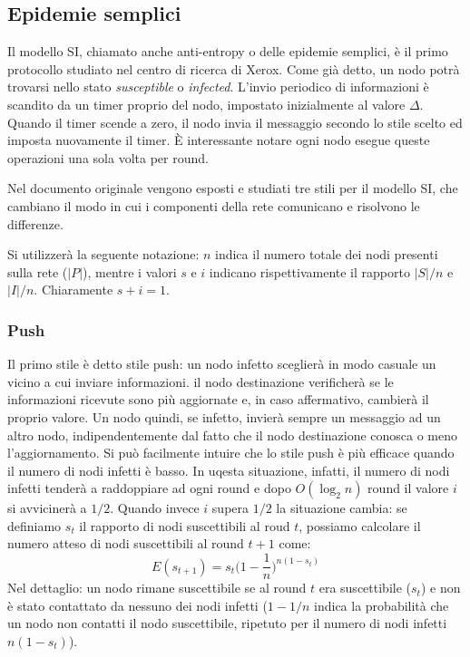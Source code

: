 \subsection{Epidemie semplici}
Il modello SI, chiamato anche anti-entropy o delle epidemie semplici, è il primo protocollo studiato nel centro di ricerca di Xerox. Come già detto, un nodo potrà trovarsi nello stato \textit{susceptible} o \textit{infected}. L'invio periodico di informazioni è scandito da un timer proprio del nodo, impostato inizialmente al valore $\Delta$. Quando il timer scende a zero, il nodo invia il messaggio secondo lo stile scelto ed imposta nuovamente il timer. È interessante notare ogni nodo esegue queste operazioni una sola volta per round.

Nel documento originale vengono esposti e studiati tre stili per il modello SI, che cambiano il modo in cui i componenti della rete comunicano e risolvono le differenze. 

Si utilizzerà la seguente notazione: $n$ indica il numero totale dei nodi presenti sulla rete ($|P|$), mentre i valori $s$ e $i$ indicano rispettivamente il rapporto $|S|/n$ e $|I|/n$. Chiaramente $s + i = 1$.
\subsubsection{Push}
Il primo stile è detto stile push: un nodo infetto sceglierà in modo casuale un vicino a cui inviare informazioni. il nodo destinazione verificherà se le informazioni ricevute sono più aggiornate e, in caso affermativo, cambierà il proprio valore. Un nodo quindi, se infetto, invierà sempre un messaggio ad un altro nodo, indipendentemente dal fatto che il nodo destinazione conosca o meno l'aggiornamento. Si può facilmente intuire che lo stile push è più efficace quando il numero di nodi infetti è basso. In uqesta situazione, infatti, il numero di nodi infetti tenderà a raddoppiare ad ogni round e dopo $O(\log_2 n)$ round il valore $i$ si avvicinerà a $1/2$. Quando invece $i$ supera $1/2$ la situazione cambia: se definiamo $s_t$ il rapporto di nodi suscettibili al roud $t$, possiamo calcolare il numero atteso di nodi suscettibili al round $t + 1$ come:
\begin{equation}
    E(s_{t + 1}) = s_t  \Big(1 - \frac{1}{n}\Big)^{n(1-s_t)}
\end{equation}
Nel dettaglio: un nodo rimane suscettibile se al round $t$ era suscettibile ($s_t$) e non è stato contattato da nessuno dei nodi infetti ($1-1/n$ indica la probabilità che un nodo non contatti il nodo suscettibile, ripetuto per il numero di nodi infetti $n(1-s_t)$).

